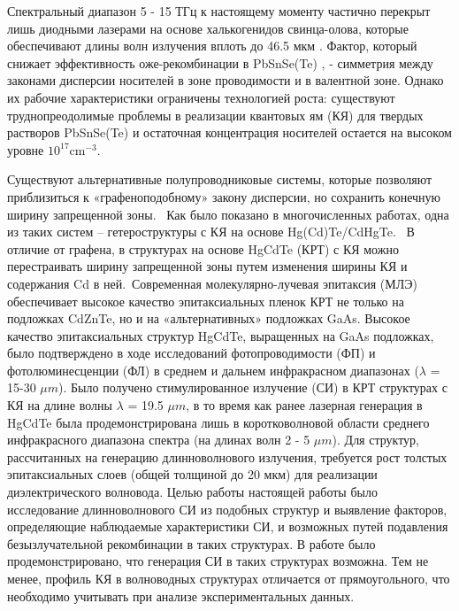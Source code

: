 \documentclass[../main.tex]{subfiles}
\begin{document}
Спектральный диапазон 5 - 15 ТГц к настоящему моменту частично 
перекрыт лишь диодными лазерами на основе халькогенидов свинца-олова, которые обеспечивают длины 
волн излучения вплоть до 46.5 мкм \cite{Intro8}. Фактор, который снижает эффективность оже-рекомбинации в PbSnSe(Te) \cite{Intro1}, \cite{Intro9}
- симметрия между законами дисперсии носителей в зоне проводимости и в валентной зоне. Однако их рабочие характеристики 
ограничены технологией роста: существуют труднопреодолимые проблемы в реализации квантовых ям (КЯ) для твердых растворов 
PbSnSe(Te) и остаточная концентрация носителей остается на высоком уровне $10^17 \text{cm}^{-3}$.

Существуют альтернативные полупроводниковые системы, которые позволяют
приблизиться к «графеноподобному» закону дисперсии, но сохранить конечную ширину запрещенной зоны. 
Как было показано в многочисленных работах, одна из таких систем -- гетероструктуры с КЯ на основе Hg(Cd)Te/CdHgTe. 
В отличие от графена, в структурах на основе HgCdTe (КРТ) с КЯ можно перестраивать ширину запрещенной зоны путем изменения ширины КЯ и 
содержания Cd в ней. Современная молекулярно-лучевая эпитаксия (МЛЭ) обеспечивает высокое качество эпитаксиальных пленок КРТ не только на подложках CdZnTe, 
но и на «альтернативных» подложках GaAs. Высокое качество эпитаксиальных структур HgCdTe, выращенных на GaAs подложках, было подтверждено в ходе исследований 
фотопроводимости (ФП) и фотолюминесценции (ФЛ) в среднем и дальнем инфракрасном диапазонах ($λ$ = 15-30 $\mu m$). Было получено 
стимулированное излучение (СИ) в КРТ структурах с КЯ на длине волны $λ$ = 19.5 $\mu m$, в то время как ранее лазерная генерация в HgCdTe была 
продемонстрирована лишь в коротковолновой области среднего инфракрасного диапазона спектра (на длинах волн 2 - 5 $\mu m$). 
Для структур, рассчитанных на генерацию длинноволнового излучения, требуется рост толстых эпитаксиальных слоев (общей толщиной до 20 мкм) для реализации диэлектрического волновода. 
Целью работы настоящей работы было исследование длинноволнового СИ из подобных структур и выявление факторов, определяющие наблюдаемые характеристики СИ, и возможных путей подавления 
безызлучательной рекомбинации в таких структурах. В работе было продемонстрировано, что генерация СИ в таких структурах возможна. Тем не менее, профиль КЯ в волноводных 
структурах отличается от прямоугольного, что необходимо учитывать при анализе экспериментальных данных.
\newpage
\end{document}

